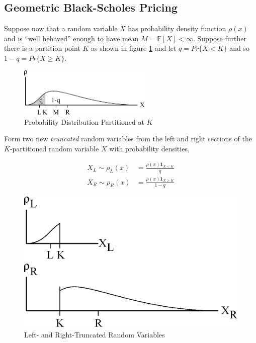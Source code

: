 \subsection{Geometric Black-Scholes Pricing}

Suppose now that a random variable $X$ has probability density function $\rho(x)$ and is ``well behaved'' enough to have mean $M = \mathbb{E}[X] < \infty$. Suppose further there is a partition point $K$ as shown in figure \ref{fig:S_T_K_generic} and let $q = Pr\{X < K\}$ and so $1 - q = Pr\{X \ge K\}$.

\begin{figure}
  \centering
  \includegraphics[width=2.5in]{Images/S_T_K.eps}
  \caption[Probability Distribution Partitioned at $K$]
          {Probability Distribution Partitioned at $K$}
  \label{fig:S_T_K_generic}
\end{figure}

Form two new \emph{truncated} random variables from the left and right sections of the $K$-partitioned random variable $X$ with probability densities,

\begin{align*}
X_L \sim \rho_L(x) &= \frac{\rho(x) \mathbf{1}_{X < K}}{q}\\
X_R \sim \rho_R(x) &= \frac{\rho(x) \mathbf{1}_{X \ge K}}{1-q}
\end{align*}

\begin{figure}
  \centering
  \includegraphics{Images/XL_XR.eps}
  \caption[Left- and Right-Truncated Random Variables]
          {Left- and Right-Truncated Random Variables}
  \label{fig:XL_XR}
\end{figure}

